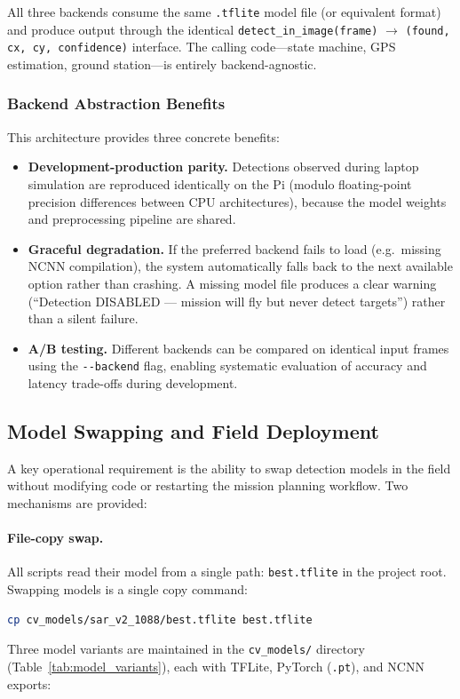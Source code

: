 All three backends consume the same \texttt{.tflite} model file (or equivalent format) and produce output through the identical \texttt{detect\_in\_image(frame)} $\to$ \texttt{(found, cx, cy, confidence)} interface.  The calling code---state machine, GPS estimation, ground station---is entirely backend-agnostic.

\subsubsection{Backend Abstraction Benefits}

This architecture provides three concrete benefits:

\begin{itemize}
    \item \textbf{Development-production parity.}  Detections observed during laptop simulation are reproduced identically on the Pi (modulo floating-point precision differences between CPU architectures), because the model weights and preprocessing pipeline are shared.
    \item \textbf{Graceful degradation.}  If the preferred backend fails to load (e.g.\ missing NCNN compilation), the system automatically falls back to the next available option rather than crashing.  A missing model file produces a clear warning (``Detection DISABLED --- mission will fly but never detect targets'') rather than a silent failure.
    \item \textbf{A/B testing.}  Different backends can be compared on identical input frames using the \texttt{-{}-backend} flag, enabling systematic evaluation of accuracy and latency trade-offs during development.
\end{itemize}

\subsection{Model Swapping and Field Deployment}\label{app:cv:swapping}

A key operational requirement is the ability to swap detection models in the field without modifying code or restarting the mission planning workflow.  Two mechanisms are provided:

\paragraph{File-copy swap.}
All scripts read their model from a single path: \texttt{best.tflite} in the project root.  Swapping models is a single copy command:
\begin{lstlisting}[language=bash,numbers=none]
cp cv_models/sar_v2_1088/best.tflite best.tflite
\end{lstlisting}
Three model variants are maintained in the \texttt{cv\_models/} directory (Table~\ref{tab:model_variants}), each with TFLite, PyTorch (\texttt{.pt}), and NCNN exports:

